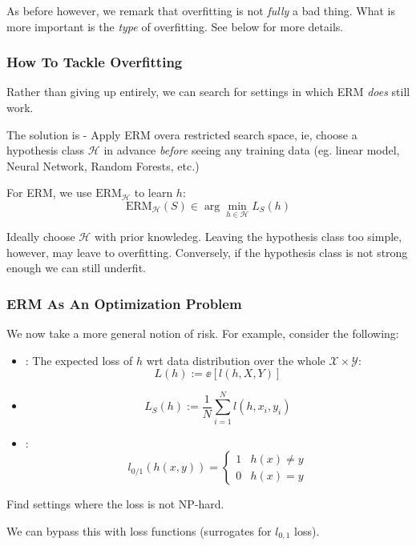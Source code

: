 \documentclass[11pt]{scrartcl}
\begin{document}
\begin{remark}
As before however, we remark that overfitting is not \textit{fully} a bad thing. What is more important is the \textit{type} of overfitting. See below for more details.
\end{remark}

\subsubsection{How To Tackle Overfitting}
Rather than giving up entirely, we can search for settings in which ERM \textit{does} still work. 

The solution is  - Apply ERM overa restricted search space, ie, choose a hypothesis class $\mathcal{H}$ in advance \textit{before} seeing any training data (eg. linear model, Neural Network, Random Forests, etc.)
\begin{ex}
For ERM, we use $\text{ERM}_{\mathcal{H}}$ to learn $h$:
$$\text{ERM}_{\mathcal{H}}(S) \in \arg\min_{h \in \mathcal{H}}L_S(h)$$
\end{ex}
Ideally choose $\mathcal{H}$ with prior knowledeg. Leaving the hypothesis class too simple, however, may leave to overfitting. Conversely, if the hypothesis class is not strong enough we can still underfit. 

\subsubsection{ERM As An Optimization Problem}
We now take a more general notion of risk. For example, consider the following:
\begin{itemize}
    \item {}: The expected loss of $h$ wrt data distribution over the whole $\mathcal{X} \times \mathcal{Y}$: $$L(h) := \ee[l(h,X,Y)]$$
    \item {} $$L_{S}(h) := \frac{1}{N}\sum_{i=1}^{N}l(h,x_i,y_i)$$
    \item {}: $$l_{0/1}(h(x,y))=\begin{cases} 1 & h(x) \ne y \\ 0 & h(x)=y\end{cases}$$
\end{itemize}

\begin{exc}
Find settings where the loss is not NP-hard.
\end{exc}

We can bypass this with loss functions (surrogates for $l_{0,1}$ loss). 
\end{document}
